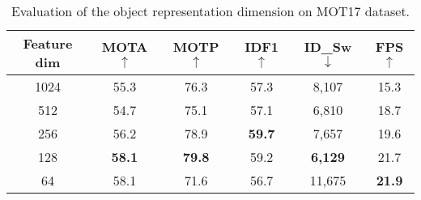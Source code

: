 \documentclass[acmsmall]{acmart}
\begin{document}

\begin{table}
	\begin{center}
		\caption{
		Evaluation of the object representation dimension on MOT17 dataset. 
		}
		\label{table:dimension}
		\centering
		\setlength{\tabcolsep}{3.5pt}
		\begin{tabular}{c|ccccc}
			\hline
			\hline
			Feature dim & MOTA $\uparrow$ & MOTP $\uparrow$ & IDF1 $\uparrow$ & ID\_Sw $\downarrow$ & FPS$ \uparrow$\\
			\hline
			1024 & 55.3 & 76.3 & 57.3 & 8,107 & 15.3\\
			512 & 54.7 & 75.1 & 57.1 & 6,810 & 18.7\\
			256 & 56.2 & 78.9 & {\bf59.7} & 7,657 & 19.6\\
			128 & {\bf58.1} & \bf{79.8} & 59.2 & {\bf6,129} & 21.7\\
			64 & 58.1 & 71.6 & 56.7 & 11,675 & {\bf21.9}\\
			\hline
			\hline
		\end{tabular}
	\end{center}
\end{table}
\setlength{\tabcolsep}{1.4pt}
\end{document}
